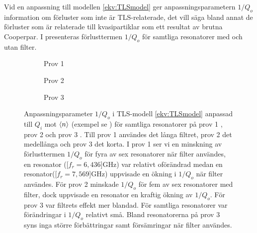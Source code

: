\documentclass[main.tex]{subfiles}
\begin{document}
Vid en anpassning till modellen \eqref{ekv:TLSmodel} ger anpassningsparametern $1/Q_o$ information om förluster som inte är TLS-relaterade, det vill säga bland annat de förluster som är relaterade till kvasipartiklar som ett resultat av brutna Cooperpar. I  presenteras förlusttermen $1/Q_o$ för samtliga resonatorer med och utan filter.


\begin{figure}[H]
    \centerfloat
    \begin{minipage}{0.85\paperwidth}
    \centerfloat
    \begin{subfigure}{0.33\textwidth}
    \centering
    \setlength{}
    \setlength\figureheight{8em}
    
    \caption{Prov 1}
    \label{fig:Q_other_1}
    \end{subfigure}
    \begin{subfigure}{0.33\textwidth}
    \centering
    \setlength{}
    \setlength\figureheight{8em}
    
    \caption{Prov 2}
    \label{fig:Q_other_2}
    \end{subfigure}
    \hspace{-1em}
    \begin{subfigure}{0.4\paperwidth}
    \centering
    \setlength{}
    \setlength\figureheight{8em}
    
    \caption{Prov 3}
    \label{fig:Q_other_3}
    \end{subfigure}
    \end{minipage}
    \caption{Anpassningsparameter $1/Q_o$ i TLS-modell \eqref{ekv:TLSmodel} anpassad till $Q_i$ mot $\expval{n}$ (exempel se ) för samtliga resonatorer på prov 1 , prov 2  och prov 3 . Till prov 1 användes det långa filtret, prov 2 det medellånga och prov 3 det korta. I prov 1 ser vi en minskning av förlusttermen $1/Q_o$ för fyra av sex resonatorer när filter användes, en resonator (\unit[$f_r=6,436$]{GHz}) var relativt oförändrad medan en resonator(\unit[$f_r=7,569$]{GHz}) uppvisade en ökning i $1/Q_o$ när filter användes. För prov 2 minskade $1/Q_o$ för fem av sex resonatorer med filter, dock uppvisade en resonator en kraftig ökning av $1/Q_o$. För prov 3 var filtrets effekt mer blandad. För samtliga resonatorer var förändringar i $1/Q_o$ relativt små. Bland resonatorerna på prov 3 syns inga större förbättringar samt försämringar när filter användes.}
    \label{fig:Q_other}
\end{figure}
\end{document}
